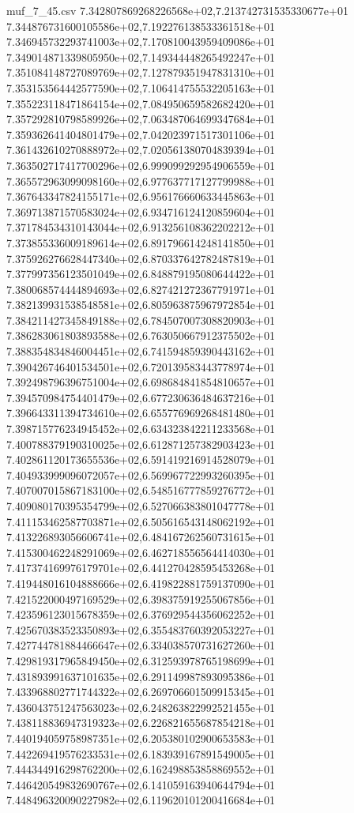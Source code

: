 \begin{filecontents*}{muf_7_45.csv}
7.342807869268226568e+02,7.213742731535330677e+01
7.344876731600105586e+02,7.192276138533361518e+01
7.346945732293741003e+02,7.170810043959409086e+01
7.349014871339805950e+02,7.149344448265492247e+01
7.351084148727089769e+02,7.127879351947831310e+01
7.353153564442577590e+02,7.106414755532205163e+01
7.355223118471864154e+02,7.084950659582682420e+01
7.357292810798589926e+02,7.063487064699347684e+01
7.359362641404801479e+02,7.042023971517301106e+01
7.361432610270888972e+02,7.020561380704839394e+01
7.363502717417700296e+02,6.999099292954906559e+01
7.365572963099098160e+02,6.977637717127799988e+01
7.367643347824155171e+02,6.956176660633445863e+01
7.369713871570583024e+02,6.934716124120859604e+01
7.371784534310143044e+02,6.913256108362202212e+01
7.373855336009189614e+02,6.891796614248141850e+01
7.375926276628447340e+02,6.870337642782487819e+01
7.377997356123501049e+02,6.848879195080644422e+01
7.380068574444894693e+02,6.827421272367791971e+01
7.382139931538548581e+02,6.805963875967972854e+01
7.384211427345849188e+02,6.784507007308820903e+01
7.386283061803893588e+02,6.763050667912375502e+01
7.388354834846004451e+02,6.741594859390443162e+01
7.390426746401534501e+02,6.720139583443778974e+01
7.392498796396751004e+02,6.698684841854810657e+01
7.394570984754401479e+02,6.677230636484637216e+01
7.396643311394734610e+02,6.655776969268481480e+01
7.398715776234945452e+02,6.634323842211233568e+01
7.400788379190310025e+02,6.612871257382903423e+01
7.402861120173655536e+02,6.591419216914528079e+01
7.404933999096072057e+02,6.569967722993260395e+01
7.407007015867183100e+02,6.548516777859276772e+01
7.409080170395354799e+02,6.527066383801047778e+01
7.411153462587703871e+02,6.505616543148062192e+01
7.413226893056606741e+02,6.484167262560731615e+01
7.415300462248291069e+02,6.462718556564414030e+01
7.417374169976179701e+02,6.441270428595453268e+01
7.419448016104888666e+02,6.419822881759137090e+01
7.421522000497169529e+02,6.398375919255067856e+01
7.423596123015678359e+02,6.376929544356062252e+01
7.425670383523350893e+02,6.355483760392053227e+01
7.427744781884466647e+02,6.334038570731627260e+01
7.429819317965849450e+02,6.312593978765198699e+01
7.431893991637101635e+02,6.291149987893095386e+01
7.433968802771744322e+02,6.269706601509915345e+01
7.436043751247563023e+02,6.248263822992521455e+01
7.438118836947319323e+02,6.226821655687854218e+01
7.440194059758987351e+02,6.205380102900653583e+01
7.442269419576233531e+02,6.183939167891549005e+01
7.444344916298762200e+02,6.162498853858869552e+01
7.446420549832690767e+02,6.141059163940644794e+01
7.448496320090227982e+02,6.119620101200416684e+01

\end{filecontents*}
